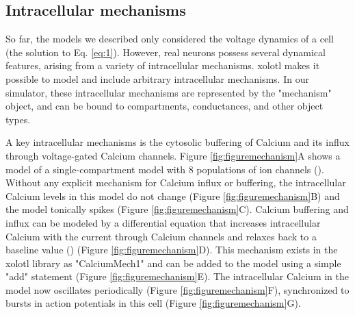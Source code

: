 \documentclass{frontiersSCNS} %
\begin{document}
%
%
%
%
%
%



\subsection{Intracellular mechanisms}

So far, the models we described only considered the voltage dynamics of a cell (the solution to Eq. \ref{eq:1}). However, real neurons possess several dynamical features, arising from a variety of intracellular mechanisms. xolotl makes it possible to model and include arbitrary intracellular mechanisms. In our simulator, these intracellular mechanisms are represented by the "mechanism" object, and can be bound to compartments, conductances, and other object types.

A key intracellular mechanisms is the cytosolic buffering of Calcium and its influx through voltage-gated Calcium channels. Figure \ref{fig:figuremechanism}A shows a model of a single-compartment model with 8 populations of ion channels (\cite{liuModelNeuronActivityDependent1998}). Without any explicit mechanism for Calcium influx or buffering, the intracellular Calcium levels in this model do not change (Figure \ref{fig:figuremechanism}B) and the model tonically spikes (Figure \ref{fig:figuremechanism}C). Calcium buffering and influx can be modeled by a differential equation that increases intracellular Calcium with the current through Calcium channels and relaxes back to a baseline value (\cite{liuModelNeuronActivityDependent1998, prinzAlternativeHandtuningConductancebased2003, dayanTheoreticalNeuroscience2001}) (Figure \ref{fig:figuremechanism}D). This mechanism exists in the xolotl library as "CalciumMech1" and can be added to the model using a simple "add" statement (Figure \ref{fig:figuremechanism}E). The intracellular Calcium in the model now oscillates periodically (Figure \ref{fig:figuremechanism}F), synchronized to bursts in action potentials in this cell (Figure \ref{fig:figuremechanism}G).
\end{document}
